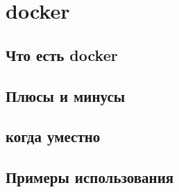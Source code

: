 \section{docker}
\subsection{Что есть docker}
\subsection{Плюсы и минусы}
\subsection{когда уместно}
\subsection{Примеры использования}
\newpage
